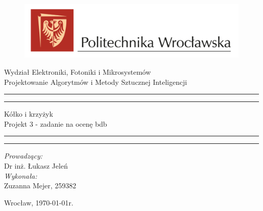 \begin{titlepage}
    \begin{figure}
        \centering
        \includegraphics[width=18cm]{logo-PWr.png}
        
        \label{fig:pwr}
    \end{figure}
        \begin{center}
            \huge Wydział Elektroniki, Fotoniki i Mikrosystemów \\ 
            \vspace{40pt}
            \huge Projektowanie Algorytmów i Metody Sztucznej Inteligencji  \\
        \end{center}
        \vspace{60pt}
        \hrule
        \vspace{1pt}
        \hrule
        \begin{center}
            {\fontsize{40}{50}\selectfont Kółko i krzyżyk\\ }
            \vspace{10pt}
            {\fontsize{25}{25}\selectfont Projekt 3 - zadanie na ocenę bdb  }
        \end{center}
        \hrule
        \vspace{1pt}
        \hrule
        \begin{flushright}
            \vspace{65pt}
            \textit{\Large Prowadzący:}\\
            
            \Large Dr inż. Łukasz Jeleń\\
            \vspace{10pt}
            \textit{\Large Wykonała:}\\
            \Large Zuzanna Mejer, 259382 \\
        
        \end{flushright}
        \vspace{65pt}
        \begin{center}
            \large Wrocław, \today r.
        \end{center}
    \end{titlepage}